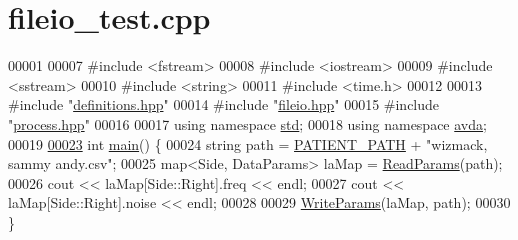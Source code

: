 \hypertarget{fileio__test_8cpp_source}{\section{fileio\+\_\+test.\+cpp}
\label{fileio__test_8cpp_source}
}

\begin{DoxyCode}
00001 
00007 \textcolor{preprocessor}{#include <fstream>}
00008 \textcolor{preprocessor}{#include <iostream>}
00009 \textcolor{preprocessor}{#include <sstream>}
00010 \textcolor{preprocessor}{#include <string>}
00011 \textcolor{preprocessor}{#include <time.h>}
00012 
00013 \textcolor{preprocessor}{#include "\hyperlink{definitions_8hpp}{definitions.hpp}"}
00014 \textcolor{preprocessor}{#include "\hyperlink{fileio_8hpp}{fileio.hpp}"}
00015 \textcolor{preprocessor}{#include "\hyperlink{process_8hpp}{process.hpp}"}
00016 
00017 \textcolor{keyword}{using namespace }\hyperlink{namespacestd}{std};
00018 \textcolor{keyword}{using namespace }\hyperlink{namespaceavda}{avda};
00019 
\hypertarget{fileio__test_8cpp_source_l00023}{}\hyperlink{fileio__test_8cpp_ae66f6b31b5ad750f1fe042a706a4e3d4}{00023} \textcolor{keywordtype}{int} \hyperlink{fileio__test_8cpp_ae66f6b31b5ad750f1fe042a706a4e3d4}{main}() \{
00024     \textcolor{keywordtype}{string} path = \hyperlink{definitions_8hpp_a5736990e7ea949fc1971afa00e421f16}{PATIENT\_PATH} + \textcolor{stringliteral}{"wizmack, sammy andy.csv"};
00025     map<Side, DataParams> laMap = \hyperlink{namespaceavda_a46dc980b65ddfc24749ce25c1290e158}{ReadParams}(path);
00026     cout <<  laMap[Side::Right].freq << endl;
00027     cout << laMap[Side::Right].noise << endl;
00028 
00029     \hyperlink{namespaceavda_a1e3f5a0eb4ee9a7010d57dc38bd8dfec}{WriteParams}(laMap, path);
00030 \}
\end{DoxyCode}
